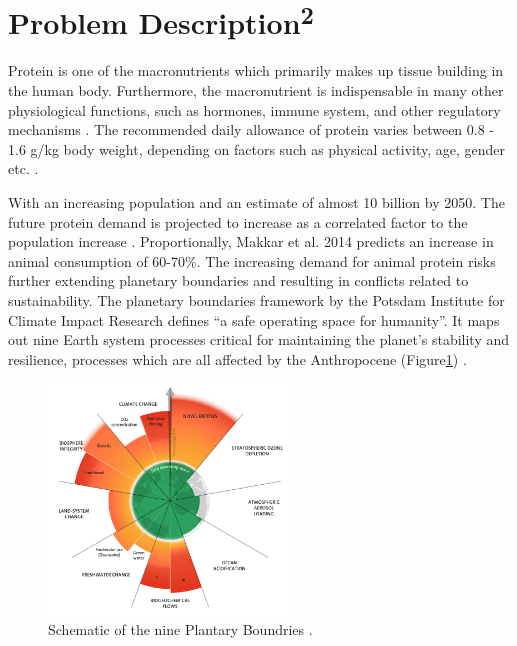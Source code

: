 \setcounter{chapter}{1}
\setcounter{section}{0}
\setlength{\headheight}{12.71342pt}
\addtolength{\topmargin}{-0.71342pt}

\section{Problem Description\textsuperscript{2}}
Protein is one of the macronutrients which primarily makes up tissue building in the human body. Furthermore, the macronutrient is indispensable in many other physiological functions, such as hormones, immune system, and other regulatory mechanisms \cite*{Ferrari2022AnimalPlantProtein}. The recommended daily allowance of protein varies between 0.8 - 1.6 g/kg body weight, depending on factors such as physical activity, age, gender etc. \cite*{Phillips2016ProteinBeyondRDA}.

\vspace{1em}
With an increasing population and an estimate of almost 10 billion by 2050. The future protein demand is projected to increase as a correlated factor to the population increase \cite*{henchion2017futureprotein}. Proportionally, Makkar et al. 2014 predicts an increase in animal consumption of 60-70\%. The increasing demand for animal protein risks further extending planetary boundaries and resulting in conflicts related to sustainability. The planetary boundaries framework by the Potsdam Institute for Climate Impact Research defines “a safe operating space for humanity”. It maps out nine Earth system processes critical for maintaining the planet's stability and resilience, processes which are all affected by the Anthropocene (Figure\ref*{fig:figure_01}) \cite*{Richardson2023EarthBeyondBoundaries}.

\begin{figure}[H]
    \centering
    \includegraphics[width=0.58\textwidth]{Figures/fig_01.png}
    \caption{Schematic of the nine Plantary Boundries \cite*{Richardson2023EarthBeyondBoundaries}.}
    \label{fig:figure_01}
\end{figure}

